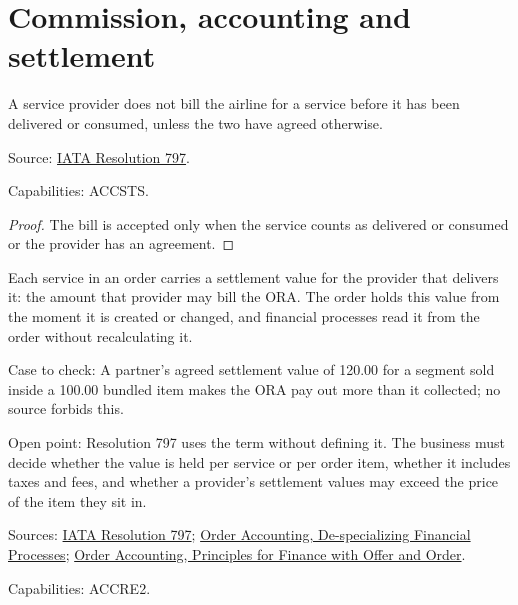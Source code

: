 
\section{Commission, accounting and settlement}

\begin{theorem}
  \label{thm:c22-bill-after-delivery}
  A service provider does not bill the airline for a service before it has
  been delivered or consumed, unless the two have agreed otherwise.

  Source: \href{https://www.iata.org/contentassets/72cbd60393ff42b5975d90ce9e049a7d/oneorder-resolution-797.pdf}{IATA Resolution 797}.

  Capabilities: ACCSTS.
\end{theorem}
\begin{proof}
  The bill is accepted only when the service counts as delivered or
  consumed or the provider has an agreement.
\end{proof}


\begin{definition}
  \label{def:accounting-settlement-value}
  Each service in an order carries a settlement value for the provider that
  delivers it: the amount that provider may bill the ORA. The order holds
  this value from the moment it is created or changed, and financial
  processes read it from the order without recalculating it.

  Case to check: A partner's agreed settlement value of 120.00 for a segment
  sold inside a 100.00 bundled item makes the ORA pay out more than it
  collected; no source forbids this.

  Open point: Resolution 797 uses the term without defining it. The business
  must decide whether the value is held per service or per order item,
  whether it includes taxes and fees, and whether a provider's settlement
  values may exceed the price of the item they sit in.

  Sources: \href{https://www.iata.org/contentassets/72cbd60393ff42b5975d90ce9e049a7d/oneorder-resolution-797.pdf}{IATA Resolution 797};
  \href{https://standards.atlassian.net/wiki/spaces/OA/pages/617185338}{Order Accounting, De-specializing Financial Processes};
  \href{https://standards.atlassian.net/wiki/spaces/OA/pages/617185366}{Order Accounting, Principles for Finance with Offer and Order}.

  Capabilities: ACCRE2.
\end{definition}

